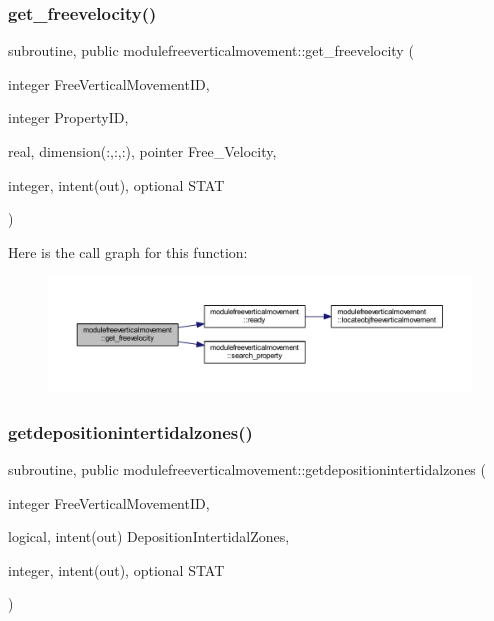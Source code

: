 \subsubsection{\texorpdfstring{get\+\_\+freevelocity()}{get\_freevelocity()}}
{\footnotesize\ttfamily subroutine, public modulefreeverticalmovement\+::get\+\_\+freevelocity (\begin{DoxyParamCaption}\item[{integer}]{Free\+Vertical\+Movement\+ID,  }\item[{integer}]{Property\+ID,  }\item[{real, dimension(\+:,\+:,\+:), pointer}]{Free\+\_\+\+Velocity,  }\item[{integer, intent(out), optional}]{S\+T\+AT }\end{DoxyParamCaption})}

Here is the call graph for this function\+:\nopagebreak
\begin{figure}[H]
\begin{center}
\leavevmode
\includegraphics[width=350pt]{namespacemodulefreeverticalmovement_ae1df1a4ce293addb56cc6c44759de660_cgraph}
\end{center}
\end{figure}
\mbox{\label{namespacemodulefreeverticalmovement_a7aea36a1bc080954215034040adc4468}} 
\subsubsection{\texorpdfstring{getdepositionintertidalzones()}{getdepositionintertidalzones()}}
{\footnotesize\ttfamily subroutine, public modulefreeverticalmovement\+::getdepositionintertidalzones (\begin{DoxyParamCaption}\item[{integer}]{Free\+Vertical\+Movement\+ID,  }\item[{logical, intent(out)}]{Deposition\+Intertidal\+Zones,  }\item[{integer, intent(out), optional}]{S\+T\+AT }\end{DoxyParamCaption})}

